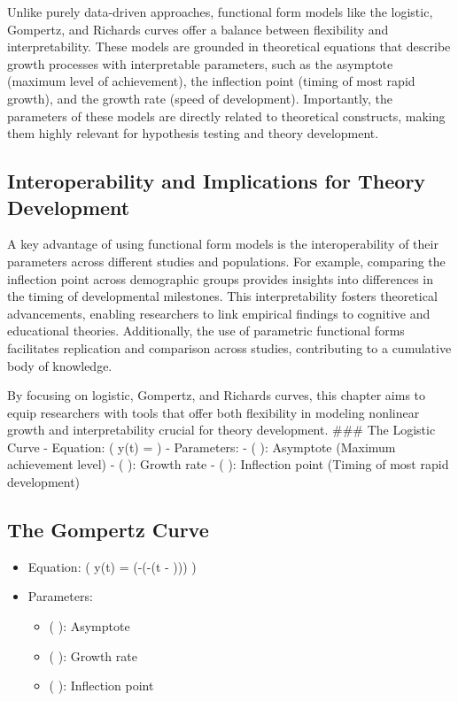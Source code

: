 \documentclass[
  letterpaper,
  DIV=11,
  numbers=noendperiod]{scrreprt}
\providecommand{\tightlist}{%
  \setlength{\itemsep}{0pt}\setlength{\parskip}{0pt}}\usepackage{longtable,booktabs,array}
\begin{document}
Unlike purely data-driven approaches, functional form models like the
logistic, Gompertz, and Richards curves offer a balance between
flexibility and interpretability. These models are grounded in
theoretical equations that describe growth processes with interpretable
parameters, such as the asymptote (maximum level of achievement), the
inflection point (timing of most rapid growth), and the growth rate
(speed of development). Importantly, the parameters of these models are
directly related to theoretical constructs, making them highly relevant
for hypothesis testing and theory development.

\subsection{Interoperability and Implications for Theory
Development}\label{interoperability-and-implications-for-theory-development}

A key advantage of using functional form models is the interoperability
of their parameters across different studies and populations. For
example, comparing the inflection point across demographic groups
provides insights into differences in the timing of developmental
milestones. This interpretability fosters theoretical advancements,
enabling researchers to link empirical findings to cognitive and
educational theories. Additionally, the use of parametric functional
forms facilitates replication and comparison across studies,
contributing to a cumulative body of knowledge.

By focusing on logistic, Gompertz, and Richards curves, this chapter
aims to equip researchers with tools that offer both flexibility in
modeling nonlinear growth and interpretability crucial for theory
development. \#\#\# The Logistic Curve - Equation: ( y(t) =
 ) - Parameters: - (
\alpha ): Asymptote (Maximum achievement level) - ( \beta ): Growth rate
- ( \gamma ): Inflection point (Timing of most rapid development)

\subsection{The Gompertz Curve}\label{the-gompertz-curve}

\begin{itemize}
\tightlist
\item
  Equation: ( y(t) = \alpha \exp(-\exp(-\beta (t - \gamma))) )
\item
  Parameters:

  \begin{itemize}
  \tightlist
  \item
    ( \alpha ): Asymptote
  \item
    ( \beta ): Growth rate
  \item
    ( \gamma ): Inflection point
  \end{itemize}
\end{itemize}
\end{document}
